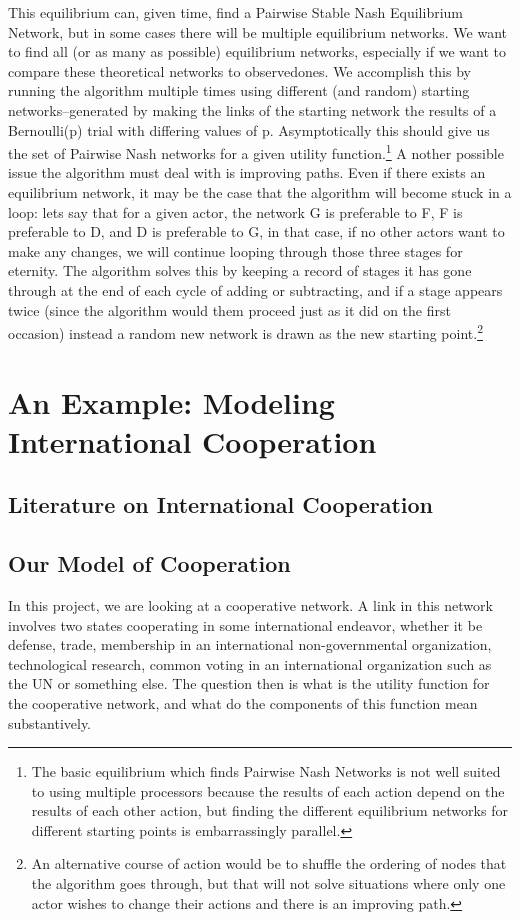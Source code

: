 \documentclass[12pt,onesided,fullpage]{amsart}
\begin{document}
This equilibrium can, given time, find a Pairwise Stable Nash Equilibrium Network, but in some cases there will be multiple equilibrium networks. We want to find all (or as many as possible) equilibrium networks, especially if we want to compare these theoretical networks to observedones. We accomplish this by running the algorithm multiple times using different (and random) starting networks--generated by making the links of the starting network the results of a Bernoulli(p) trial with differing values of p. Asymptotically this should give us the set of Pairwise Nash networks for a given utility function.\footnote{The basic equilibrium which finds Pairwise Nash Networks is not well suited to using multiple processors because the results of each action depend on the results of each other action, but finding the different equilibrium networks for different starting points is embarrassingly parallel.} A nother possible issue the algorithm must deal with is improving paths. Even if there exists an equilibrium network, it may be the case that the algorithm will become stuck in a loop: lets say that for a given actor, the network G is preferable to F, F is preferable to D, and D is preferable to G, in that case, if no other actors want to make any changes, we will continue looping through those three stages for eternity. The algorithm solves this by keeping a record of stages it has gone through at the end of each cycle of adding or subtracting, and if a stage appears twice (since the algorithm would them proceed just as it did on the first occasion) instead a random new network is drawn as the new starting point.\footnote{An alternative course of action would be to shuffle the ordering of nodes that the algorithm goes through, but that will not solve situations where only one actor wishes to change their actions and there is an improving path.}
\section{An Example: Modeling International Cooperation}
\subsection{Literature on International Cooperation}
\subsection{Our Model of Cooperation}
In this project, we are looking at a cooperative network. A link in this network involves two states cooperating in some international endeavor, whether it be defense, trade, membership in an international non-governmental organization, technological research, common voting in an international organization such as the UN or something else. The question then is what is the utility function for the cooperative network, and what do the components of this function mean substantively.
\end{document}
